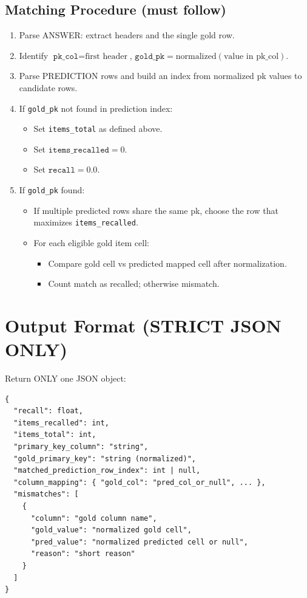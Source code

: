 \begin{tcolorbox}
\subsection*{Matching Procedure (must follow)}

\begin{enumerate}
    \item Parse ANSWER: extract headers and the single gold row.
    \item Identify $\texttt{pk\_col} = \text{first header}$, $\texttt{gold\_pk} = \text{normalized}(\text{value in pk\_col})$.
    \item Parse PREDICTION rows and build an index from normalized pk values to candidate rows.
    \item If \texttt{gold\_pk} not found in prediction index:
    \begin{itemize}
        \item Set \texttt{items\_total} as defined above.
        \item Set $\texttt{items\_recalled} = 0$.
        \item Set $\texttt{recall} = 0.0$.
    \end{itemize}
    \item If \texttt{gold\_pk} found:
    \begin{itemize}
        \item If multiple predicted rows share the same pk, choose the row that maximizes \texttt{items\_recalled}.
        \item For each eligible gold item cell:
        \begin{itemize}
            \item Compare gold cell vs predicted mapped cell after normalization.
            \item Count match as recalled; otherwise mismatch.
        \end{itemize}
    \end{itemize}
\end{enumerate}

\section*{Output Format (STRICT JSON ONLY)}

Return ONLY one JSON object:

\begin{lstlisting}[breaklines=true, basicstyle=\ttfamily, frame=none]
{
  "recall": float,
  "items_recalled": int,
  "items_total": int,
  "primary_key_column": "string",
  "gold_primary_key": "string (normalized)",
  "matched_prediction_row_index": int | null,
  "column_mapping": { "gold_col": "pred_col_or_null", ... },
  "mismatches": [
    {
      "column": "gold column name",
      "gold_value": "normalized gold cell",
      "pred_value": "normalized predicted cell or null",
      "reason": "short reason"
    }
  ]
}
\end{lstlisting}


\end{tcolorbox}
